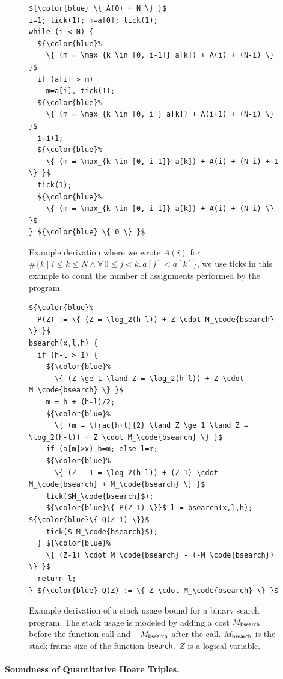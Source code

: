 \documentclass[nocopyrightspace,preprint,pldi]{sigplanconf-pldi15}
\begin{document}
{\begin{figure}
\begin{lstlisting}
${\color{blue} \{ A(0) + N \} }$
i=1; tick(1); m=a[0]; tick(1);
while (i < N) {
  ${\color{blue}%
    \{ (m = \max_{k \in [0, i-1]} a[k]) + A(i) + (N-i) \} }$
  if (a[i] > m)
    m=a[i], tick(1);
  ${\color{blue}%
    \{ (m = \max_{k \in [0, i]} a[k]) + A(i+1) + (N-i) \} }$
  i=i+1;
  ${\color{blue}%
    \{ (m = \max_{k \in [0, i-1]} a[k]) + A(i) + (N-i) + 1 \} }$
  tick(1);
  ${\color{blue}%
    \{ (m = \max_{k \in [0, i-1]} a[k]) + A(i) + (N-i) \} }$
} ${\color{blue} \{ 0 \} }$
\end{lstlisting}
\caption{Example derivation where we wrote $A(i)$
  for $\#\{ k \mid i \le k \le N \land \forall\, 0\le j<k.\, a[j] < a[k]\}$,
  we use ticks in this example to count the number of assignments performed
  by the program.
  }
\label{fig:xmplmax}
\end{figure}

\begin{figure}
\begin{lstlisting}
${\color{blue}%
  P(Z) := \{ (Z = \log_2(h-l)) + Z \cdot M_\code{bsearch} \} }$
bsearch(x,l,h) {
  if (h-l > 1) {
    ${\color{blue}%
      \{ (Z \ge 1 \land Z = \log_2(h-l)) + Z \cdot M_\code{bsearch} \} }$
    m = h + (h-l)/2;
    ${\color{blue}%
      \{ (m = \frac{h+l}{2} \land Z \ge 1 \land Z = \log_2(h-l)) + Z \cdot M_\code{bsearch} \} }$
    if (a[m]>x) h=m; else l=m;
    ${\color{blue}%
      \{ (Z - 1 = \log_2(h-l)) + (Z-1) \cdot M_\code{bsearch} + M_\code{bsearch} \} }$
    tick($M_\code{bsearch}$);
    ${\color{blue}\{ P(Z-1) \}}$ l = bsearch(x,l,h); ${\color{blue}\{ Q(Z-1) \}}$
    tick($-M_\code{bsearch}$);
  } ${\color{blue}%
    \{ (Z-1) \cdot M_\code{bsearch} - (-M_\code{bsearch}) \} }$
  return l;
} ${\color{blue} Q(Z) := \{ Z \cdot M_\code{bsearch} \} }$
\end{lstlisting}
\caption{Example derivation of a stack usage bound for a binary
  search program.  The stack usage is modeled by adding a cost $M_{\mathsf{bsearch}}$ before
  the function call and $-M_{\mathsf{bsearch}}$ after the call.  $M_{\mathsf{bsearch}}$ is the stack
  frame size of the function $\mathsf{bsearch}$.  $Z$ is a logical variable.
  }
\label{fig:xmplbs}
\end{figure}


\paragraph{Soundness of Quantitative Hoare Triples.}

}
\end{document}
